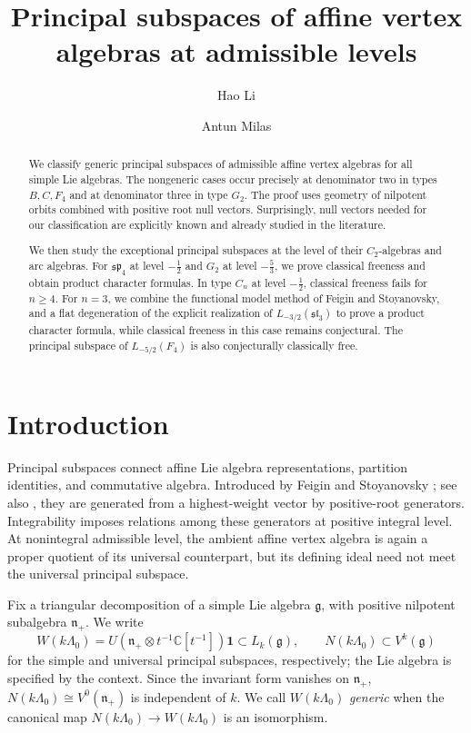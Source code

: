 \documentclass[11pt]{amsart}
\title[Principal subspaces at admissible levels]{Principal subspaces of affine vertex algebras at admissible levels}
\author{Hao Li}
\author{Antun Milas}
\date{}
\theoremstyle{definition}
\theoremstyle{remark}
\newcommand{\C}{\mathbb C}
\newcommand{\g}{\mathfrak g}
\newcommand{\n}{\mathfrak n_+}
\newcommand{\vac}{\mathbf1}
\begin{document}
\begin{abstract}
We classify generic principal subspaces of admissible affine
vertex algebras for all simple Lie algebras. The nongeneric cases occur
precisely at denominator two in types $B,C,F_4$ and at denominator three
in type $G_2$. The proof uses geometry of nilpotent orbits combined with positive root
null vectors. Surprisingly, null vectors needed for our classification are explicitly known and already 
studied in the literature.

We then study the exceptional principal subspaces at the
level of their $C_2$-algebras and arc algebras. For $\mathfrak{sp}_4$ at
level $-\frac12$ and $G_2$ at level $-\frac53$, we prove classical freeness
and obtain product character formulas.  In type $C_n$ at level
$-\frac12$, classical freeness fails for $n\ge4$. For $n=3$, we combine the functional model method of Feigin and Stoyanovsky, and a flat degeneration of the explicit realization of $L_{-3/2}(\mathfrak{sl}_3)$ to prove a product character formula, while classical freeness in this case remains conjectural. The principal subspace of $L_{-5/2}(F_4)$ is also conjecturally 
classically free.
\end{abstract}
\maketitle

\section{Introduction}
Principal subspaces connect affine Lie algebra representations, partition
identities, and commutative algebra. Introduced by Feigin and Stoyanovsky
\cite{FS}; see also \cite{CLM0, CLM,LiMilas}, they are generated from a highest-weight vector by positive-root
generators. Integrability imposes relations among these generators at positive
integral level. At nonintegral admissible level, the ambient affine vertex
algebra is again a proper quotient of its universal counterpart, but its
defining ideal need not meet the universal principal subspace.

Fix a triangular decomposition of a simple Lie algebra $\g$, with positive
nilpotent subalgebra $\n$. We write
\begin{equation}\label{eq:intro-principal}
 W(k\Lambda_0)=U(\n\otimes t^{-1}\C[t^{-1}])\vac\subset L_k(\g),
 \qquad N(k\Lambda_0)\subset V^k(\g)
\end{equation}
for the simple and universal principal subspaces, respectively; the Lie
algebra is specified by the context. Since the invariant form vanishes on
$\n$, $N(k\Lambda_0)\cong V^0(\n)$ is independent of $k$. We call $W(k\Lambda_0)$
\emph{generic} when the canonical map $N(k\Lambda_0)\to W(k\Lambda_0)$
is an isomorphism. 
\end{document}
